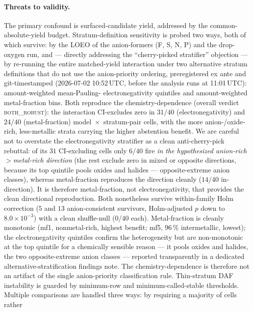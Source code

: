 \documentclass[11pt]{article}
\begin{document}
\paragraph{Threats to validity.} The primary confound is surfaced-candidate yield, addressed
by the common-absolute-yield budget. Stratum-definition sensitivity is probed two ways, both of
which survive: by the LOEO of the anion-formers (F, S, N, P) and the drop-oxygen run, and ---
directly addressing the ``cherry-picked stratifier'' objection --- by re-running the entire
matched-yield interaction under two alternative stratum definitions that do not use the
anion-priority ordering, preregistered ex ante and git-timestamped (2026-07-02 10:52\,UTC,
before the analysis runs at 11:01\,UTC): amount-weighted mean-Pauling-
electronegativity quintiles and amount-weighted metal-fraction bins. Both reproduce the
chemistry-dependence (overall verdict \textsc{both\_robust}):
the interaction CI-excludes zero in
$31/40$ (electronegativity) and $24/40$ (metal-fraction) model~$\times$~stratum-pair cells, with
the more anion-/oxide-rich, less-metallic strata carrying the higher abstention benefit. We are
careful not to overstate the electronegativity stratifier as a clean anti-cherry-pick rebuttal:
of its $31$ CI-excluding cells only $6/40$ fire \emph{in the hypothesized anion-rich$>$metal-rich
direction} (the rest exclude zero in mixed or opposite directions, because its top quintile pools
oxides and halides --- opposite-extreme anion classes), whereas metal-fraction reproduces the
direction cleanly ($14/40$ in-direction). It is therefore metal-fraction, not electronegativity,
that provides the clean directional reproduction. Both nonetheless survive within-family Holm
correction ($5$ and $13$ anion-consistent survivors, Holm-adjusted
$p$ down to $8.0\times10^{-3}$) with a clean shuffle-null ($0/40$ each). Metal-fraction is
cleanly monotonic (mf1, nonmetal-rich, highest benefit; mf5, $96\,\%$ intermetallic, lowest);
the electronegativity quintiles confirm the heterogeneity but are non-monotonic at the top
quintile for a chemically sensible reason --- it pools oxides and halides, the two
opposite-extreme anion classes --- reported transparently in a dedicated
alternative-stratification findings note. The chemistry-dependence is therefore not an artifact
of the single anion-priority classification rule.
Thin-stratum DAF instability is guarded by minimum-row and minimum-called-stable thresholds.
Multiple comparisons are handled three ways: by requiring a majority of cells rather
\end{document}
